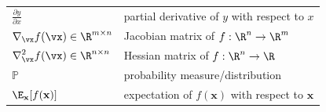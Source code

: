 \documentclass{article}
\newcommand{\x}{\mathbf{x}}
\begin{document}
\begin{tabular}{>{\centering\arraybackslash}p{2.25in} >{\arraybackslash}p{3.15in}}


$\displaystyle \frac{\partial y} {\partial x} $ & partial derivative of $y$ with respect to $x$ \\ [2ex]
$\displaystyle \nabla_\vx f(\vx) \in \R^{m\times n}$ & Jacobian matrix of $f: \R^n \rightarrow \R^m$\\ [2ex]
$\displaystyle \nabla_\vx^2 f(\vx) \in \R^{n\times n}$ & Hessian matrix of $f: \R^n \rightarrow \R$\\

$\displaystyle \mathbb{P}$ & probability measure/distribution \\
$\displaystyle  \E_{\x} [ f(\x) ]$ & expectation of $f(\x)$ with respect to $\x$ \\
\end{tabular}
\vspace{0.25cm}

\end{document}
